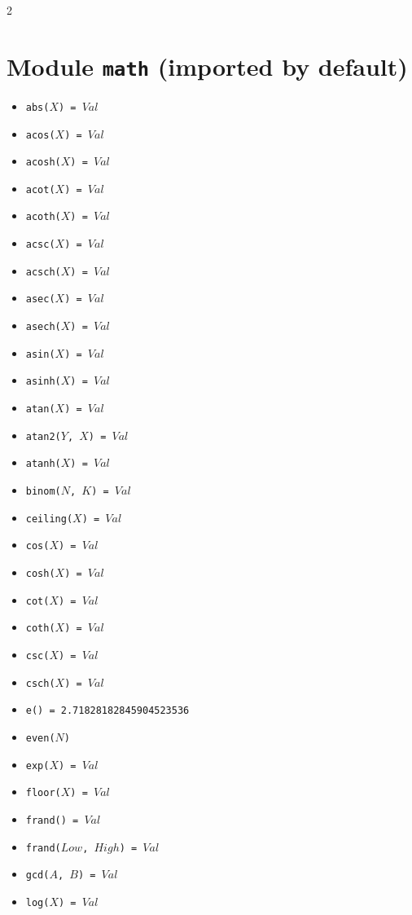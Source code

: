 \documentclass[10pt]{article}
\begin{document}
\begin{multicols}{2}
\section*{Module \texttt{math} (imported by default)}
\begin{scriptsize}
\begin{itemize}
   \item \texttt{abs($X$) = $Val$} 
   \item \texttt{acos($X$) = $Val$}
   \item \texttt{acosh($X$) = $Val$} 
   \item \texttt{acot($X$) = $Val$}
   \item \texttt{acoth($X$) = $Val$} 
   \item \texttt{acsc($X$) = $Val$} 
   \item \texttt{acsch($X$) = $Val$} 
   \item \texttt{asec($X$) = $Val$}
   \item \texttt{asech($X$) = $Val$} 
   \item \texttt{asin($X$) = $Val$}
   \item \texttt{asinh($X$) = $Val$} 
   \item \texttt{atan($X$) = $Val$}
   \item \texttt{atan2($Y$, $X$) = $Val$}
   \item \texttt{atanh($X$) = $Val$} 
    \item\texttt{binom($N$, $K$) = $Val$}
   \item \texttt{ceiling($X$) = $Val$} 
   \item \texttt{cos($X$) = $Val$} 
   \item \texttt{cosh($X$)  = $Val$} 
   \item \texttt{cot($X$) = $Val$}
   \item \texttt{coth($X$)  = $Val$} 
   \item \texttt{csc($X$) = $Val$}
   \item \texttt{csch($X$)  = $Val$} 
   \item \texttt{e() = 2.71828182845904523536} 
   \item \texttt{even($N$)} 
   \item \texttt{exp($X$) = $Val$} 
   \item \texttt{floor($X$) = $Val$} 
   \item \texttt{frand() = $Val$}
   \item \texttt{frand($Low$, $High$) = $Val$}    
   \item \texttt{gcd($A$, $B$) = $Val$} 
   \item \texttt{log($X$) = $Val$}

\end{itemize}
\end{scriptsize}
\end{multicols}
\end{document}
